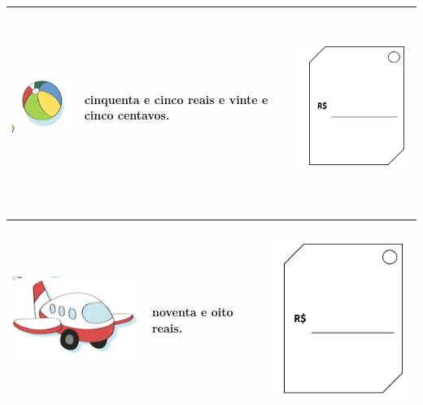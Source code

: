 
\begin{longtable}[]{@{}lll@{}}
\toprule
\includegraphics[width=1.16683in,height=1.08348in]{media/image57.png} &
cinquenta e cinco reais e vinte e cinco centavos. &
\includegraphics[width=2.19822in,height=2.44826in]{media/image56.png}\tabularnewline
\bottomrule
\end{longtable}


\pagebreak

\begin{longtable}[]{@{}lll@{}}
\toprule
\includegraphics[width=1.96902in,height=1.29185in]{media/image58.png} &
noventa e oito reais. &
\includegraphics[width=2.19822in,height=2.44826in]{media/image56.png}\tabularnewline
\bottomrule
\end{longtable}

